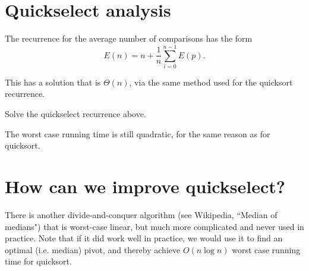 \section{Quickselect analysis}
The recurrence for the average number of comparisons has the form 
$$E(n) = n + \frac{1}{n} \sum_{i=0}^{n-1} E(p)\text{.}$$

This has a solution that is $\Theta(n)$, via the same method used for the quicksort recurrence.

\begin{Boxample}[6]
Solve the quickselect recurrence above.
\end{Boxample}

The worst case running time is still quadratic, for the same reason as for quicksort.

\section{How can we improve quickselect?}
There is another divide-and-conquer algorithm (see Wikipedia, ``Median of medians") that is worst-case linear, 
but much more complicated and never used in practice. 
Note that if it did work well in practice, we would use it to find an optimal (i.e. median) pivot, 
and thereby achieve $O(n\log n)$ worst case running time for quicksort.


